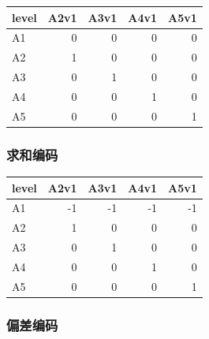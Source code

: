 \documentclass[
]{book}
\begin{document}
\begin{table}
\centering
\begin{tabular}{l|r|r|r|r}
\hline
level & A2v1 & A3v1 & A4v1 & A5v1\\
\hline
A1 & 0 & 0 & 0 & 0\\
\hline
A2 & 1 & 0 & 0 & 0\\
\hline
A3 & 0 & 1 & 0 & 0\\
\hline
A4 & 0 & 0 & 1 & 0\\
\hline
A5 & 0 & 0 & 0 & 1\\
\hline
\end{tabular}
\end{table}

\hypertarget{ux6c42ux548cux7f16ux7801-1}{%
\subsubsection{求和编码}\label{ux6c42ux548cux7f16ux7801-1}}

\begin{table}
\centering
\begin{tabular}{l|r|r|r|r}
\hline
level & A2v1 & A3v1 & A4v1 & A5v1\\
\hline
A1 & -1 & -1 & -1 & -1\\
\hline
A2 & 1 & 0 & 0 & 0\\
\hline
A3 & 0 & 1 & 0 & 0\\
\hline
A4 & 0 & 0 & 1 & 0\\
\hline
A5 & 0 & 0 & 0 & 1\\
\hline
\end{tabular}
\end{table}

\hypertarget{ux504fux5deeux7f16ux7801-1}{%
\subsubsection{偏差编码}\label{ux504fux5deeux7f16ux7801-1}}
\end{document}
